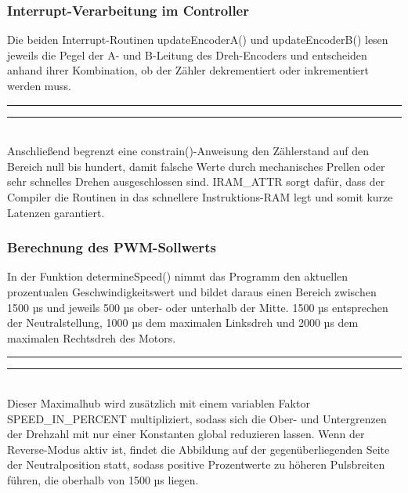 \documentclass[a4paper,12pt]{article}
\begin{document}
\subsubsection{Interrupt-Verarbeitung im Controller}
\label{sec:Interrupt-Verarbeitung im Controller}

Die beiden Interrupt-Routinen updateEncoderA() und updateEncoderB() lesen jeweils die Pegel der A- und B-Leitung des Dreh-Encoders und entscheiden anhand ihrer Kombination, ob der Zähler dekrementiert oder inkrementiert werden muss. 
\newline\noindent\rule{\linewidth}{0.4pt}  %

\noindent\rule{\linewidth}{0.4pt}\\[0.5em]  %
Anschließend begrenzt eine constrain()-Anweisung den Zählerstand auf den Bereich null bis hundert, damit falsche Werte durch mechanisches Prellen oder sehr schnelles Drehen ausgeschlossen sind. IRAM\_ATTR\cite{espidf_memory_iram} sorgt dafür, dass der Compiler die Routinen in das schnellere Instruktions-RAM legt und somit kurze Latenzen garantiert.

\subsubsection{Berechnung des PWM-Sollwerts}
\label{sec:Berechnung des PWM-Sollwerts}
In der Funktion determineSpeed() nimmt das Programm den aktuellen prozentualen Geschwindigkeitswert und bildet daraus einen Bereich zwischen 1500 µs und jeweils 500 µs ober- oder unterhalb der Mitte. 1500 µs entsprechen der Neutralstellung, 1000 µs dem maximalen Linksdreh und 2000 µs dem maximalen Rechtsdreh des Motors.
\newline\noindent\rule{\linewidth}{0.4pt}  %

\noindent\rule{\linewidth}{0.4pt}\\[0.5em]  %

Dieser Maximalhub wird zusätzlich mit einem variablen Faktor SPEED\_IN\_PERCENT multipliziert, sodass sich die Ober- und Untergrenzen der Drehzahl mit nur einer Konstanten global reduzieren lassen. Wenn der Reverse-Modus aktiv ist, findet die Abbildung auf der gegenüberliegenden Seite der Neutralposition statt, sodass positive Prozentwerte zu höheren Pulsbreiten führen, die oberhalb von 1500 µs liegen. \newline
\end{document}
